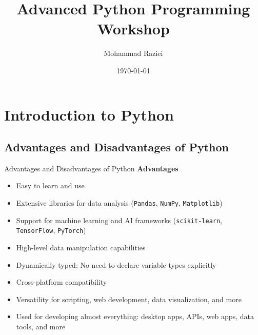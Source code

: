\documentclass[10pt]{beamer}
\title{Advanced Python Programming Workshop} %
\author{Mohammad Raziei} %
\institute[Sharif University] %
{
	\faUniregistry\ Sharif University of Technology\\ %
	\medskip
	\href{mailto://mohammadraziei1375@gmail.com}{\faMailBulk\  mohammadraziei1375@gmail.com}\\ %
	\medskip
	\href{https://github.com/mohammadraziei}{\faGithub\ mohammadraziei} %
}
\date{\today} %
\let\olditem\item
\renewcommand\item{\olditem\justifying}
\begin{document}
	
	
	\begin{frame}
		\titlepage
	\end{frame}
	
	
	\begin{frame}[allowframebreaks]
		\tableofcontents
	\end{frame}
	
	\section{Introduction to Python}
	\subsection{Advantages and Disadvantages of Python}
	\begin{frame}{Advantages and Disadvantages of Python}
		\textbf{Advantages} 
		\hfill {} \\[0.1cm]
		\begin{itemize}
			\item Easy to learn and use
			\item Extensive libraries for data analysis (\texttt{Pandas}, \texttt{NumPy}, \texttt{Matplotlib})
			\item Support for machine learning and AI frameworks (\texttt{scikit-learn}, \texttt{TensorFlow}, \texttt{PyTorch})
			\item High-level data manipulation capabilities
			\item Dynamically typed: No need to declare variable types explicitly
			\item Cross-platform compatibility
			\item Versatility for scripting, web development, data visualization, and more
			\item Used for developing almost everything: desktop apps, APIs, web apps, data tools, and more
		\end{itemize}
	\end{frame}
	
\end{document}
